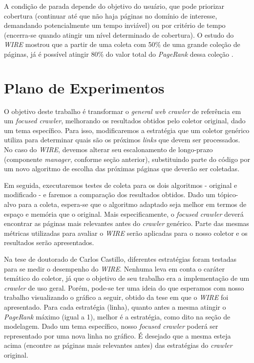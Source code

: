 \documentclass[a4paper,12pt,titlepage]{article}
\begin{document}
A condição de parada depende do objetivo do usuário, que pode priorizar cobertura (continuar até que não haja páginas no domínio de interesse, demandando potencialmente um tempo inviável) ou por critério de tempo (encerra-se quando atingir um nível determinado de cobertura). O estudo do \textit{WIRE} mostrou que a partir de uma coleta com 50\% de uma grande coleção de páginas, já é possível atingir 80\% do valor total do \textit{PageRank} dessa coleção \cite{carlos}.


\section{Plano de Experimentos}

O objetivo deste trabalho é transformar o \textit{general web crawler} de referência em um \textit{focused crawler}, melhorando os resultados obtidos pelo coletor original, dado um tema específico. Para isso, modificaremos a estratégia que um coletor genérico utiliza para determinar quais são os próximos \textit{links} que devem ser processados. No caso do \textit{WIRE}, devemos alterar seu escalonamento de longo-prazo (componente \textit{manager}, conforme seção anterior), substituindo parte do código por um novo algoritmo de escolha das próximas páginas que deverão ser coletadas.

Em seguida, executaremos testes de coleta para os dois algoritmos - original e modificado - e faremos a comparação dos resultados obtidos. Dado um tópico-alvo para a coleta, espera-se que o algoritmo adaptado seja melhor em termos de espaço e memória que o original. Mais especificamente, o \textit{focused crawler} deverá encontrar as páginas mais relevantes antes do \textit{crawler} genérico. Parte das mesmas métricas utilizadas para avaliar o \textit{WIRE} serão aplicadas para o nosso coletor e os resultados serão apresentados.

Na tese de doutorado de Carlos Castillo, diferentes estratégias foram testadas para se medir o desempenho do \textit{WIRE}. Nenhuma leva em conta o caráter temático do coletor, já que o objetivo de seu trabalho era a implementação de um \textit{crawler} de uso geral.
Porém, pode-se ter uma ideia do que esperamos com nosso trabalho visualizando o gráfico a seguir, obtido da tese em que o \textit{WIRE} foi apresentado. Para cada estratégia (linha), quanto antes a mesma atingir o \textit{PageRank} \cite{pagerank} máximo (igual a 1), melhor é a estratégia, como dito na seção de modelagem. Dado um tema específico, nosso \textit{focused crawler} poderá ser representado por uma nova linha no gráfico. É desejado que a mesma esteja acima (encontre as páginas mais relevantes antes) das estratégias do \textit{crawler} original.
\end{document}
